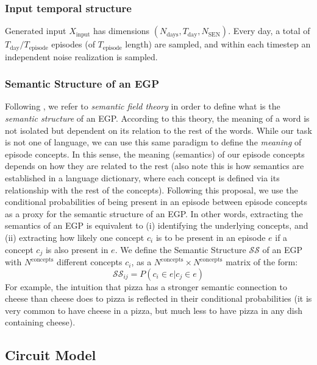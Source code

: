 \documentclass{article}
\begin{document}
\subsubsection*{Input temporal structure}
Generated input $X_\textrm{input}$ has dimensions $(N_\textrm{days}, T_\textrm{day}, N_\textrm{SEN})$. Every day, a total of $T_\textrm{day}/T_\textrm{episode}$ episodes (of $T_\textrm{episode}$ length) are sampled, and within each timestep an independent noise realization is sampled. 
\subsubsection*{Semantic Structure of an EGP}
Following , we refer to  \textit{semantic field theory}  in order to define what is the \textit{semantic structure} of an EGP. According to this theory, the meaning of a word is not isolated but dependent on its relation to the rest of the words. While our task is not one of language, we can use this same paradigm to define the \textit{meaning} of episode concepts. In this sense, the meaning (semantics) of our episode concepts depends on how they are related to the rest (also note this is how semantics are established in a language dictionary, where each concept is defined via its relationship with the rest of the concepts). 
\newline\newline
Following this proposal, we use the conditional probabilities of being present in an episode between episode concepts as a proxy for the semantic structure of an EGP. In other words, extracting the semantics of an EGP is equivalent to (i) identifying the underlying concepts, and (ii) extracting how likely one concept $c_i$ is to be present in an episode $e$ if a concept $c_j$ is also present in $e$. We define the Semantic Structure $\mathcal{SS}$ of an EGP with $N^\textrm{concepts}$ different concepts $c_i$, as a $N^\textrm{concepts}\times N^\textrm{concepts}$ matrix of the form:
\begin{equation}
    \mathcal{SS}_{ij} = P(c_i \in e|c_j \in e) 
    \label{eq:semantic_structure}
\end{equation}
For example, the intuition that pizza has a stronger semantic connection to cheese than cheese does to pizza is reflected in their conditional probabilities (it is very common to have cheese in a pizza, but much less to have pizza in any dish containing cheese).  
\subsection*{Circuit Model}
\end{document}
